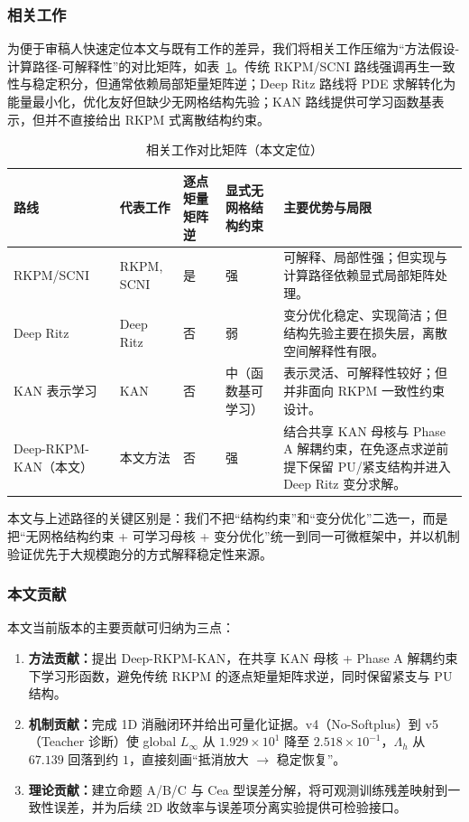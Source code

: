 ﻿\documentclass[lang=cn,a4paper]{elegantpaper}
\begin{document}
\subsubsection{相关工作}
为便于审稿人快速定位本文与既有工作的差异，我们将相关工作压缩为“方法假设-计算路径-可解释性”的对比矩阵，如表~\ref{tab:related-work-matrix}。传统 RKPM/SCNI 路线强调再生一致性与稳定积分\cite{liu1995rkpm,chen2001scni}，但通常依赖局部矩量矩阵逆；Deep Ritz 路线将 PDE 求解转化为能量最小化\cite{e2018deepritz}，优化友好但缺少无网格结构先验；KAN 路线提供可学习函数基表示\cite{liu2024kan}，但并不直接给出 RKPM 式离散结构约束。

\begin{table}[htbp]
  \centering
  \small
  \caption{相关工作对比矩阵（本文定位）}
  \label{tab:related-work-matrix}
  \begin{tabular}{p{2.4cm}p{2.9cm}p{1.8cm}p{2.0cm}p{4.1cm}}
    \toprule
    路线 & 代表工作 & 逐点矩量矩阵逆 & 显式无网格结构约束 & 主要优势与局限 \\
    \midrule
    RKPM/SCNI & RKPM\cite{liu1995rkpm}, SCNI\cite{chen2001scni} & 是 & 强 & 可解释、局部性强；但实现与计算路径依赖显式局部矩阵处理。 \\
    Deep Ritz & Deep Ritz\cite{e2018deepritz} & 否 & 弱 & 变分优化稳定、实现简洁；但结构先验主要在损失层，离散空间解释性有限。 \\
    KAN 表示学习 & KAN\cite{liu2024kan} & 否 & 中（函数基可学习） & 表示灵活、可解释性较好；但并非面向 RKPM 一致性约束设计。 \\
    Deep-RKPM-KAN（本文） & 本文方法 & 否 & 强 & 结合共享 KAN 母核与 Phase A 解耦约束，在免逐点求逆前提下保留 PU/紧支结构并进入 Deep Ritz 变分求解。 \\
    \bottomrule
  \end{tabular}
\end{table}

本文与上述路径的关键区别是：我们不把“结构约束”和“变分优化”二选一，而是把“无网格结构约束 + 可学习母核 + 变分优化”统一到同一可微框架中，并以机制验证优先于大规模跑分的方式解释稳定性来源。

\subsubsection{本文贡献}
本文当前版本的主要贡献可归纳为三点：
\begin{enumerate}[label=\arabic*.]
  \item \textbf{方法贡献：}提出 Deep-RKPM-KAN，在共享 KAN 母核 + Phase A 解耦约束下学习形函数，避免传统 RKPM 的逐点矩量矩阵求逆，同时保留紧支与 PU 结构。
  \item \textbf{机制贡献：}完成 1D 消融闭环并给出可量化证据。v4（No-Softplus）到 v5（Teacher 诊断）使 global $L_\infty$ 从 $1.929\times10^1$ 降至 $2.518\times10^{-1}$，$\Lambda_h$ 从 $67.139$ 回落到约 $1$，直接刻画“抵消放大 $\rightarrow$ 稳定恢复”。
  \item \textbf{理论贡献：}建立命题 A/B/C 与 Cea 型误差分解，将可观测训练残差映射到一致性误差，并为后续 2D 收敛率与误差项分离实验提供可检验接口。
\end{enumerate}
\end{document}
